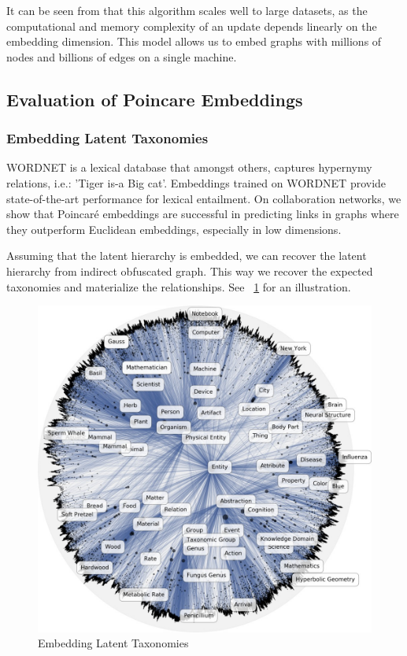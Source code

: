 It can be seen from that this algorithm scales well to large datasets, as the computational and memory complexity of an update depends linearly on the embedding dimension. This model allows us to embed graphs with millions of nodes and billions of edges on a single machine.

\subsection{Evaluation of Poincare Embeddings}
\subsubsection{Embedding Latent Taxonomies}

WORDNET is a lexical database that amongst others, captures hypernymy relations, i.e.: 'Tiger is-a Big cat'. Embeddings trained on WORDNET provide state-of-the-art performance for lexical entailment. On collaboration networks, we show that Poincaré embeddings are successful in predicting links in graphs where they outperform Euclidean embeddings, especially in low dimensions.  

Assuming that the latent hierarchy is embedded, we can recover the latent hierarchy from indirect obfuscated graph. This way we recover the expected taxonomies and materialize the relationships. See ~\ref{fig:wn-nouns} for an illustration.
\begin{figure}[htb]
  \centering
    \includegraphics[width=\textwidth]{lectures/11-b/Images/wn-nouns2.jpg}
    \caption{Embedding Latent Taxonomies}
    \label{fig:wn-nouns}
\end{figure}

